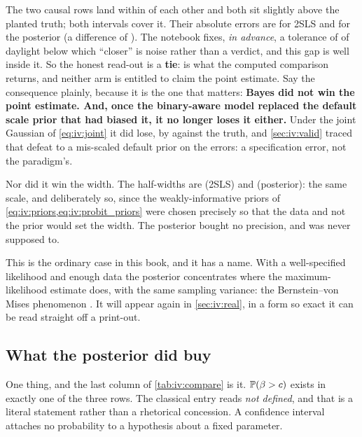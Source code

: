 The two causal rows land within \eur{\nbElevenEstDiff} of each other and both sit slightly above the
planted truth; both intervals cover it. Their absolute errors are \eur{\nbElevenIvAbsErr} for 2SLS
and \eur{\nbElevenBayesAbsErr} for the posterior (a difference of \eur{\nbElevenErrGap}). The
notebook fixes, \emph{in advance}, a tolerance of \eur{\nbElevenTieTol} of daylight below which
``closer'' is noise rather than a verdict, and this gap is well inside it. So the honest read-out is
a \textbf{tie}: \nbElevenCloser{} is what the computed comparison returns, and neither arm is entitled
to claim the point estimate. Say the consequence plainly, because it is the one that matters:
\textbf{Bayes did not win the point estimate. And, once the binary-aware model replaced the
default scale prior that had biased it, it no longer loses it either.} Under the joint Gaussian of
\cref{eq:iv:joint} it did lose, by \eur{\nbElevenGaussErr} against the truth, and \cref{sec:iv:valid}
traced that defeat to a mis-scaled default prior on the errors: a specification error, not the
paradigm's.

Nor did it win the width. The half-widths are \eur{\nbElevenIvHalf} (2SLS) and
\eur{\nbElevenBayesHalf} (posterior): the same scale, and deliberately so, since the
weakly-informative priors of \cref{eq:iv:priors,eq:iv:probit_priors} were chosen precisely so that
the data and not the prior would set the width. The posterior bought no precision, and was never
supposed to.

This is the ordinary case in this book, and it has a name. With a well-specified likelihood and
enough data the posterior concentrates where the maximum-likelihood estimate does, with the same
sampling variance: the Bernstein--von Mises phenomenon \citep{vandervaart1998, gelman2013}. It
will appear again in \cref{sec:iv:real}, in a form so exact it can be read straight off a print-out.

\subsection*{What the posterior did buy}

One thing, and the last column of \cref{tab:iv:compare} is it. $\operatorname{\mathbb{P}}(\beta > c)$ exists in
exactly one of the three rows. The classical entry reads \emph{not defined}, and that is a literal
statement rather than a rhetorical concession. A confidence interval attaches no probability to a
hypothesis about a fixed parameter.

